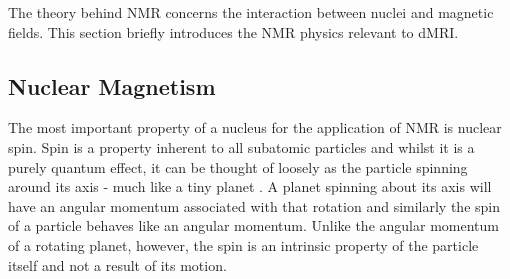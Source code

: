 The theory behind \ac{NMR} concerns the interaction between nuclei and magnetic fields. This section briefly introduces the \ac{NMR} physics relevant to \ac{dMRI}.

\subsection{Nuclear Magnetism}
\label{sec:bg_nuclearmagnetism}

The most important property of a nucleus for the application of \ac{NMR} is nuclear spin. 
Spin is a property inherent to all subatomic particles and whilst it is a purely quantum effect, it can be thought of loosely as the particle spinning around its axis - much like a tiny planet \cite{Levitt2008}.
A planet spinning about its axis will have an angular momentum associated with that rotation and similarly the spin of a particle behaves like an angular momentum.
Unlike the angular momentum of a rotating planet, however, the spin is an intrinsic property of the particle itself and not a result of its motion\cite{Levitt2008}.

